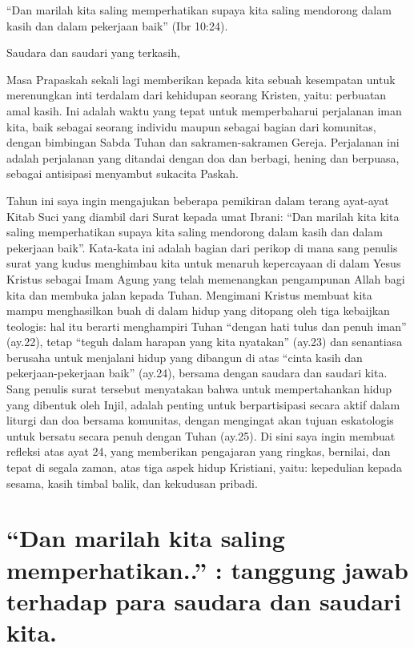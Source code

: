 
``Dan  marilah kita saling memperhatikan supaya kita saling mendorong dalam kasih dan dalam pekerjaan baik'' (Ibr 10:24).

\small
Saudara dan saudari yang terkasih,

Masa Prapaskah sekali lagi memberikan kepada kita sebuah kesempatan untuk merenungkan inti terdalam dari kehidupan seorang Kristen, yaitu: perbuatan amal kasih. Ini adalah waktu yang tepat untuk memperbaharui perjalanan iman kita, baik sebagai seorang individu maupun sebagai bagian dari komunitas, dengan bimbingan Sabda Tuhan dan sakramen-sakramen Gereja. Perjalanan ini adalah perjalanan yang ditandai dengan doa dan berbagi, hening dan berpuasa, sebagai antisipasi menyambut sukacita Paskah.

Tahun ini saya ingin mengajukan beberapa pemikiran dalam terang ayat-ayat Kitab Suci yang diambil dari Surat kepada umat Ibrani: ``Dan marilah kita kita saling memperhatikan supaya kita saling mendorong dalam kasih dan dalam pekerjaan baik''. Kata-kata ini adalah bagian dari perikop di mana sang penulis surat yang kudus menghimbau kita untuk menaruh kepercayaan di dalam Yesus Kristus sebagai Imam Agung yang telah memenangkan pengampunan Allah bagi kita dan membuka jalan kepada Tuhan. Mengimani Kristus membuat kita mampu menghasilkan buah di dalam hidup yang ditopang oleh tiga kebaijkan teologis: hal itu berarti menghampiri Tuhan ``dengan hati tulus dan penuh iman'' (ay.22), tetap ``teguh dalam harapan yang kita nyatakan'' (ay.23) dan senantiasa berusaha untuk menjalani hidup yang dibangun di atas ``cinta kasih dan pekerjaan-pekerjaan baik'' (ay.24), bersama dengan saudara dan saudari kita. Sang penulis surat tersebut menyatakan bahwa untuk mempertahankan hidup yang dibentuk oleh Injil, adalah penting untuk berpartisipasi secara aktif dalam liturgi dan doa bersama komunitas, dengan mengingat akan tujuan eskatologis untuk bersatu secara penuh dengan Tuhan (ay.25). Di sini saya ingin membuat refleksi atas ayat 24, yang memberikan pengajaran yang ringkas, bernilai, dan tepat di segala zaman, atas tiga aspek hidup Kristiani, yaitu: kepedulian kepada sesama, kasih timbal balik, dan kekudusan pribadi.

\section{``Dan  marilah kita saling memperhatikan..'' : tanggung jawab terhadap para saudara dan saudari kita.}

